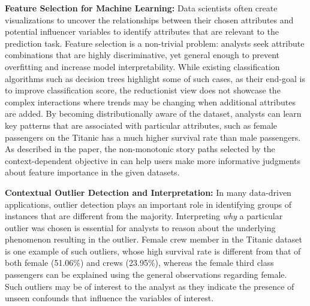 \npar \textbf{Feature Selection for Machine Learning:} Data scientists often create visualizations to uncover the relationships between their chosen attributes and potential influencer variables to identify attributes that are relevant to the prediction task. Feature selection is a non-trivial problem: analysts seek attribute combinations that are highly discriminative, yet general enough to prevent overfitting and increase model interpretability. While existing classification algorithms such as decision trees highlight some of such cases, as their end-goal is to improve classification score, the reductionist view does not showcase the complex interactions where trends may be changing when additional attributes are added. By becoming distributionally aware of the dataset, analysts can learn key patterns that are associated with particular attributes, such as female passengers on the Titanic has a much higher survival rate than male passengers. As described in the paper, the non-monotonic story paths selected by the context-dependent objective in \system {} can help users make more informative judgments about feature importance in the given datasets. 

\npar \textbf{Contextual Outlier Detection and Interpretation:} In many data-driven applications, outlier detection plays an important role in identifying groups of instances that are different from the majority. Interpreting \textit{why} a particular outlier was chosen is essential for analysts to reason about the underlying phenomenon resulting in the outlier. Female crew member in the Titanic dataset is one example of such outliers, whose high survival rate is different from that of both female (51.06\%) and crews (23.95\%), whereas the female third class passengers can be explained using the general observations regarding female. Such outliers may be of interest to the analyst as they indicate the presence of unseen confounds that influence the variables of interest.


